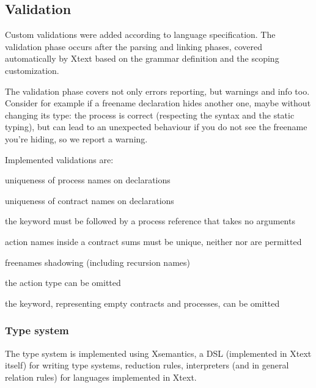 \subsection{Validation}
Custom validations were added according to \coco language specification. The validation phase occurs after the parsing and linking phases, covered automatically by Xtext based on the grammar definition and the scoping customization.

The validation phase covers not only errors reporting, but warnings and info too. Consider for example if a freename declaration hides another one, maybe without changing its type: the process is correct (respecting the syntax and the static typing), but can lead to an unexpected behaviour if you do not see the freename you're hiding, so we report a warning.

Implemented validations are:
\begin{description}\itemsep0pt

	\item[\error{error}:] uniqueness of process names on declarations
	
	\item[\error{error}:] uniqueness of contract names on declarations
	
	\item[\error{error}:] the  keyword must be followed by a process reference that takes no arguments

	\item[\error{error}:] action names inside a contract sums must be unique, \ie neither  nor  are permitted
	
	\item[\warning{warning}:] freenames shadowing (including recursion names)
	
	\item[\info{info}:] the  action type can be omitted
	
	\item[\info{info}:] the  keyword, representing empty contracts and  processes, can be omitted
	
\end{description}

\subsubsection{Type system}
The \coco type system is implemented using Xsemantics, a DSL (implemented in Xtext itself) for writing type systems, reduction rules, interpreters (and in general relation rules) for languages implemented in Xtext.

